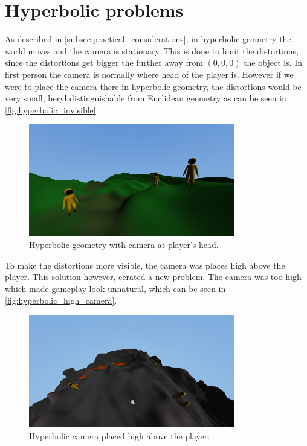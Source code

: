 \section{Hyperbolic problems} \label{sec:hyperbolic_problems}
As described in \autoref{subsec:practical_considerations}, in hyperbolic geometry the world moves and the camera is stationary.
This is done to limit the distortions, since the distortions get bigger the further away from $(0,0,0)$ the object is.
In first person the camera is normally where head of the player is.
However if we were to place the camera there in hyperbolic geometry, the distortions would be very small, beryl distinguishable from Euclidean geometry as can be seen in \autoref{fig:hyperbolic_invisible}.

\begin{figure}[H]
    \centering
    \includegraphics[width=0.8\textwidth]{chapters/problems/resources/hyperbolic-invisible.png}
    \caption{Hyperbolic geometry with camera at player's head.}
    \label{fig:hyperbolic_invisible}
\end{figure}

To make the distortions more visible, the camera was places high above the player.
This solution however, cerated a new problem.
The camera was too high which made gameplay look unnatural, which can be seen in \autoref{fig:hyperbolic_high_camera}.

\begin{figure}[H]
    \centering
    \includegraphics[width=0.8\textwidth]{chapters/problems/resources/hyperbolic-high-camera.png}
    \caption{Hyperbolic camera placed high above the player.}
    \label{fig:hyperbolic_high_camera}
\end{figure}

